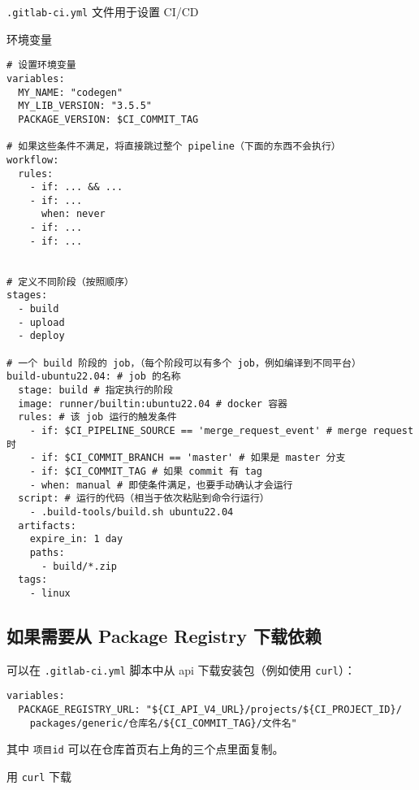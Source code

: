 
\verb`.gitlab-ci.yml` 文件用于设置 CI/CD

环境变量
\begin{lstlisting}[language=none]
# 设置环境变量
variables:
  MY_NAME: "codegen"
  MY_LIB_VERSION: "3.5.5"
  PACKAGE_VERSION: $CI_COMMIT_TAG

# 如果这些条件不满足，将直接跳过整个 pipeline（下面的东西不会执行）
workflow:
  rules:
    - if: ... && ...
    - if: ...
      when: never
    - if: ...
    - if: ...


# 定义不同阶段（按照顺序）
stages:
  - build
  - upload
  - deploy

# 一个 build 阶段的 job，（每个阶段可以有多个 job，例如编译到不同平台）
build-ubuntu22.04: # job 的名称
  stage: build # 指定执行的阶段
  image: runner/builtin:ubuntu22.04 # docker 容器
  rules: # 该 job 运行的触发条件
    - if: $CI_PIPELINE_SOURCE == 'merge_request_event' # merge request 时
    - if: $CI_COMMIT_BRANCH == 'master' # 如果是 master 分支
    - if: $CI_COMMIT_TAG # 如果 commit 有 tag
    - when: manual # 即使条件满足，也要手动确认才会运行
  script: # 运行的代码（相当于依次粘贴到命令行运行）
    - .build-tools/build.sh ubuntu22.04
  artifacts:
    expire_in: 1 day
    paths:
      - build/*.zip
  tags:
    - linux
\end{lstlisting}

\subsection{如果需要从 Package Registry 下载依赖}
可以在 \verb`.gitlab-ci.yml` 脚本中从 api 下载安装包（例如使用 \verb`curl`）：
\begin{lstlisting}[language=none]
variables:
  PACKAGE_REGISTRY_URL: "${CI_API_V4_URL}/projects/${CI_PROJECT_ID}/
    packages/generic/仓库名/${CI_COMMIT_TAG}/文件名"
\end{lstlisting}
其中 \verb`项目id` 可以在仓库首页右上角的三个点里面复制。

用 \verb`curl` 下载
